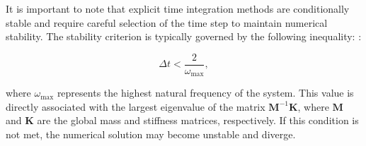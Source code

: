 \documentclass{article}
\begin{document}
	
	It is important to note that explicit time integration methods are conditionally stable and require careful selection of the time step to maintain numerical stability. The stability criterion is typically governed by the following inequality:
	:
	
	\begin{equation}
		\Delta t < \frac{2}{\omega_{\max}},
	\end{equation}
	
	where \( \omega_{\max} \) represents the highest natural frequency of the system. This value is directly associated with the largest eigenvalue of the matrix \( \mathbf{M}^{-1} \mathbf{K} \), where \( \mathbf{M} \) and \( \mathbf{K} \) are the global mass and stiffness matrices, respectively. If this condition is not met, the numerical solution may become unstable and diverge.
	
\end{document}
